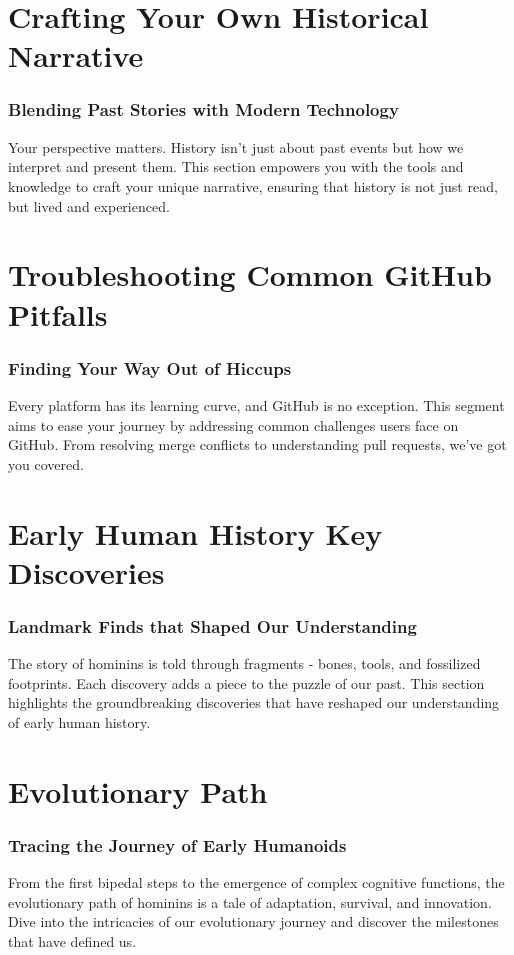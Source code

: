 \documentclass[a4paper,12pt]{book}
\begin{document}
\chapter{Crafting Your Own Historical Narrative}
\subsection*{Blending Past Stories with Modern Technology}
Your perspective matters. History isn't just about past events but how we interpret and present them. This section empowers you with the tools and knowledge to craft your unique narrative, ensuring that history is not just read, but lived and experienced.

\chapter{Troubleshooting Common GitHub Pitfalls}
\subsection*{Finding Your Way Out of Hiccups}
Every platform has its learning curve, and GitHub is no exception. This segment aims to ease your journey by addressing common challenges users face on GitHub. From resolving merge conflicts to understanding pull requests, we've got you covered.



\chapter{Early Human History Key Discoveries}
\subsection*{Landmark Finds that Shaped Our Understanding}
The story of hominins is told through fragments - bones, tools, and fossilized footprints. Each discovery adds a piece to the puzzle of our past. This section highlights the groundbreaking discoveries that have reshaped our understanding of early human history.

\chapter{Evolutionary Path}
\subsection*{Tracing the Journey of Early Humanoids}
From the first bipedal steps to the emergence of complex cognitive functions, the evolutionary path of hominins is a tale of adaptation, survival, and innovation. Dive into the intricacies of our evolutionary journey and discover the milestones that have defined us.
\end{document}
